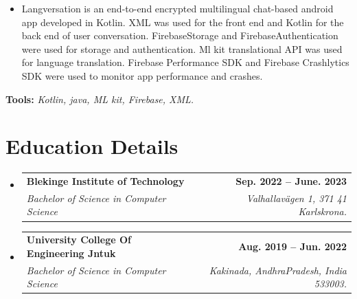 \documentclass[letterpaper,11pt]{article}
\makeatletter
\newcommand{\resumeItem}[1]{
  \item\small{
    {#1 \vspace{-2pt}}
  }
}
\newcommand{\resumeSubheading}[4]{
  \vspace{-2pt}\item
    \begin{tabular*}{1.0\textwidth}[t]{l@{\extracolsep{\fill}}r}
      \textbf{#1} & \textbf{\small #2} \\
      \textit{\small#3} & \textit{\small #4} \\
    \end{tabular*}\vspace{-7pt}
}
\newcommand{\resumeSubHeadingListStart}{\begin{itemize}[leftmargin=0.0in, label={}]}
\newcommand{\resumeSubHeadingListEnd}{\end{itemize}}
\newcommand{\resumeItemListStart}{\begin{itemize}}
\newcommand{\resumeItemListEnd}{\end{itemize}\vspace{-5pt}}
\makeatother
\begin{document}
          \vspace{-8pt}
          \resumeItemListStart
          \resumeItem{Langversation is an end-to-end encrypted multilingual chat-based android app developed in Kotlin. XML was used for the front end and Kotlin for the back end of user conversation. FirebaseStorage and FirebaseAuthentication were used for storage and authentication. Ml kit translational API was used for language translation. Firebase Performance SDK and Firebase Crashlytics SDK were used to monitor app performance and crashes.}
          \resumeItemListEnd 
          \textbf{Tools:}\emph{
Kotlin, java, ML kit, Firebase, XML.}


                

\section{Education Details  \faGraduationCap   }

 
  \resumeSubHeadingListStart
    \resumeSubheading
      {Blekinge Institute of Technology}{Sep. 2022 -- June. 2023}
      {Bachelor of Science in Computer Science}{\faMapMarker Valhallavägen 1, 371 41 Karlskrona.}
  \resumeSubHeadingListEnd
    \vspace{-7pt}
  \resumeSubHeadingListStart
    \resumeSubheading
      {University College Of Engineering Jntuk}{Aug. 2019 -- Jun. 2022}
      {Bachelor of Science in Computer Science}{\faMapMarker Kakinada, AndhraPradesh, India 533003.}
  \resumeSubHeadingListEnd
\end{document}
